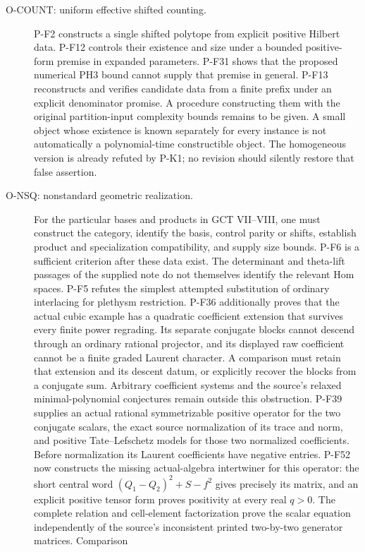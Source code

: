 \documentclass[11pt,a4paper]{article}
\begin{document}
\begin{description}
\item[O-COUNT: uniform effective shifted counting.]
P-F2 constructs a single shifted polytope from explicit positive Hilbert
data. P-F12 controls their existence and size under a bounded
positive-form premise in expanded parameters. P-F31 shows that the
proposed numerical PH3 bound cannot supply that premise in general. P-F13 reconstructs
and verifies candidate data from a finite prefix under an explicit
denominator promise. A procedure constructing them with the original
partition-input complexity bounds remains to be given. A small object
whose existence is known separately for every instance is not automatically
a polynomial-time constructible object. The homogeneous version is already
refuted by P-K1; no revision should silently restore that false assertion.

\item[O-NSQ: nonstandard geometric realization.]
For the particular bases and products in GCT VII--VIII, one must construct
the category, identify the basis, control parity or shifts, establish
product and specialization compatibility, and supply size bounds.
P-F6 is a sufficient criterion after these data exist. The determinant
and theta-lift passages of the supplied note do not themselves identify
the relevant Hom spaces. P-F5 refutes the simplest attempted substitution
of ordinary interlacing for plethysm restriction.
P-F36 additionally proves that the actual cubic example has a
quadratic coefficient extension that survives every finite power
regrading. Its separate conjugate blocks cannot descend through
an ordinary rational projector, and its displayed raw coefficient
cannot be a finite graded Laurent character. A comparison must
retain that extension and its descent datum, or explicitly recover
the blocks from a conjugate sum. Arbitrary coefficient systems
and the source's relaxed minimal-polynomial conjectures remain
outside this obstruction.
P-F39 supplies an actual rational symmetrizable positive operator
for the two conjugate scalars, the exact source normalization of
its trace and norm, and positive Tate--Lefschetz models for those
two normalized coefficients. Before normalization its Laurent
coefficients have negative entries. P-F52 now constructs the
missing actual-algebra intertwiner for this operator: the short
central word $(Q_1-Q_2)^2+S-f^2$ gives precisely its matrix,
and an explicit positive tensor form proves positivity at every
real $q>0$. The complete relation and cell-element factorization
prove the scalar equation independently of the source's
inconsistent printed two-by-two generator matrices. Comparison

\end{description}
\end{document}
